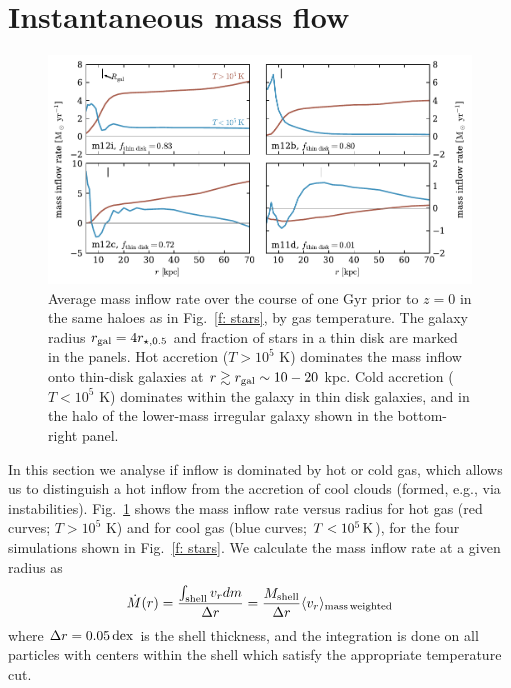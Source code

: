 \documentclass[fleqn,usenatbib]{mnras}
\newcommand{\Mdot}{\dot{M}}
\begin{document}
\section{Instantaneous mass flow}
\label{s: appendix-mass flow}

\begin{figure}
    \centering
    \includegraphics{figures/Mdot.pdf}
    \caption{
    Average mass inflow rate over the course of one Gyr prior to $z=0$ in the same haloes as in Fig.~\ref{f: stars}, by gas temperature.
    The galaxy radius $r_{\rm gal}=4 r_{\star,0.5}$ and fraction of stars in a thin disk are marked in the panels. 
    Hot accretion ($T>10^5$ K) dominates the mass inflow onto thin-disk galaxies at $r \gtrsim r_{\rm gal} \sim 10-20$ kpc.
    Cold accretion ($T<10^5$ K) dominates within the galaxy in thin disk galaxies, and in the halo of the lower-mass irregular galaxy shown in the bottom-right panel.
    }
    \label{f: Mdot}
\end{figure}

In this section we analyse if inflow is dominated by hot or cold gas, which allows us to distinguish a hot inflow from the accretion of cool clouds (formed, e.g., via instabilities).
Fig.~\ref{f: Mdot} shows the mass inflow rate versus radius for hot gas (red curves; $T>10^5$ K) and for cool gas (blue curves; $T < 10^5\,{\rm K}$),  for the four simulations shown in Fig.~\ref{f: stars}. 
We calculate the mass inflow rate at a given radius as
\begin{equation}
     \Mdot(r) = \frac{\int_{\rm shell} v_r dm}{\Delta r} = \frac{M_{\rm shell}}{\Delta r} \langle v_r\rangle_{\rm mass\, weighted}
     \label{e: Mdot}
\end{equation}
where $\Delta r=0.05\,{\rm dex}$ is the shell thickness, and the integration is done on all particles with centers within the shell which satisfy the appropriate temperature cut. 
\end{document}
